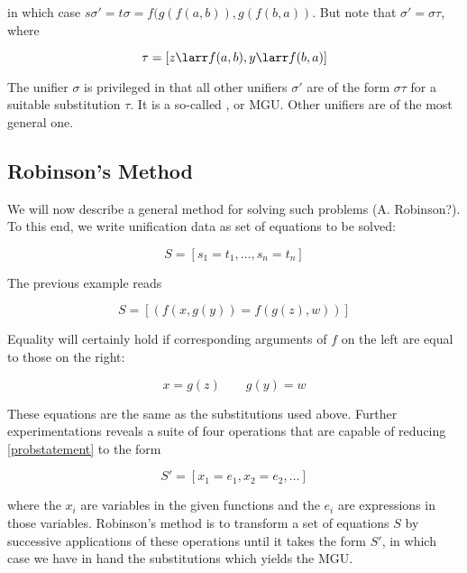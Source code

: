in which case $s\sigma' = t\sigma = f(g(f(a,b)), g(f(b,a))$. But note that $\sigma' = \sigma\tau$, 
where

\begin{equation}
\tau = [z \larr f(a,b), y \larr f(b,a)  ]
\end{equation}

The unifier $\sigma$ is privileged in that all other unifiers $\sigma'$ are of the form $\sigma\tau$ for a suitable substitution $\tau$.  It is a so-called , or MGU.  Other unifiers are  of the most general one.

\subsection{Robinson's Method}

We will now describe a general method for solving such problems (A. Robinson?).  To this end, we write unification data as set of equations to be solved:

\begin{equation}
\label{probstatement}
S = [s_1 = t_1, \ldots, s_n = t_n]
\end{equation}

The previous example reads

\begin{equation}
S = [ ( f(x,g(y)) =f(g(z), w) )]
\end{equation}

Equality will certainly hold if corresponding arguments of $f$ on the left are equal to those on the right:

\begin{equation}
x = g(z) \qquad g(y) = w
\end{equation}

These equations are the same as the substitutions used above.  Further experimentations reveals a suite of four operations that are capable of reducing  \eqref{probstatement} to the form

\begin{equation}
\label{probsolution}
S' = [x_1 = e_1, x_2 = e_2, \ldots]
\end{equation}

where the $x_i$ are variables in the given functions and the $e_i$ are expressions in those variables.  Robinson's method is to transform a set of equations $S$ by successive applications of these operations until it takes the form $S'$, in which case we have in hand the substitutions which yields the MGU. 

